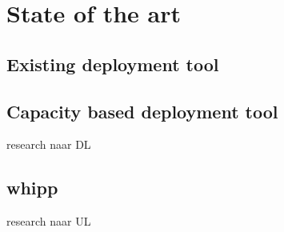 \chapter{State of the art}
\label{chap:stateoftheart}

\section{Existing deployment tool}

\section{Capacity based deployment tool}
research naar DL

\section{whipp}
research naar UL